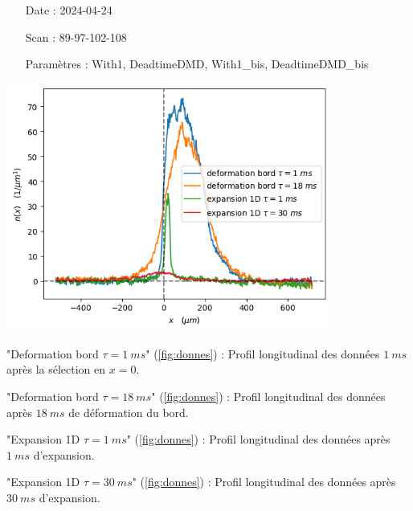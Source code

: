 \documentclass[a3, 10pt,twoside]{article}          %
\theoremstyle{plain}
\theoremstyle{definition}
\theoremstyle{remark}
\theoremstyle{definition} %
\def\OliveGreen{OliveGreen}
\begin{document}
	\begin{minipage}[b]{0.45\textwidth} 
    \begin{itemize}
        \item[Date :] 2024-04-24
        \item[Scan :] 89-97-102-108
        \item[Paramètres :] With1, DeadtimeDMD, With1\_bis, DeadtimeDMD\_bis
    \end{itemize}

    \vspace{1em} %
    
        \centering
        \includegraphics[width=0.8\textwidth]{Figures/donnees_24-04-2024} %

    \vspace{1em} %
    
    \begin{enumerate}[label=\alph*)]
        {\color{blue} \item \color{blue} "Deformation bord $\tau = 1~ms$" (\ref{fig:donnes}) : Profil longitudinal des données $1~ms$ après la sélection en $x = 0$.}
        {\color{orange}\item "Deformation bord $\tau = 18~ms$" (\ref{fig:donnes}) : Profil longitudinal des données après $18~ms$ de déformation du bord.}
        {\color{\OliveGreen} \item "Expansion 1D $\tau = 1~ms$" (\ref{fig:donnes}) : Profil longitudinal des données après $1~ms$ d'expansion.}
        {\color{red} \item "Expansion 1D $\tau = 30~ms$" (\ref{fig:donnes}) : Profil longitudinal des données après $30~ms$ d'expansion.}
    \end{enumerate}
  \end{minipage}
\end{document}
